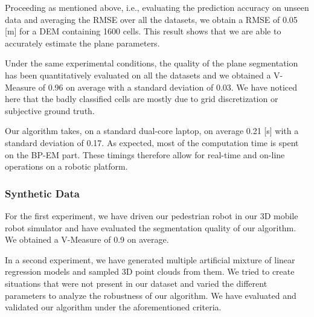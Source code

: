 Proceeding as mentioned above, i.e., evaluating the prediction accuracy on
unseen data and averaging the RMSE over all the datasets, we obtain a RMSE of
0.05 [m] for a DEM containing 1600 cells. This result shows that we are able
to accurately estimate the plane parameters.

Under the same experimental conditions, the quality of the plane segmentation
has been quantitatively evaluated on all the datasets and we obtained a
V-Measure of 0.96 on average with a standard deviation of 0.03. We have noticed
here that the badly classified cells are mostly due to grid discretization
or subjective ground truth.

Our algorithm takes, on a standard dual-core laptop, on average 0.21 [s] with
a standard deviation of 0.17. As expected, most of the computation time is spent
on the BP-EM part. These timings therefore allow for real-time and on-line
operations on a robotic platform.

\subsubsection{Synthetic Data}

For the first experiment, we have driven our pedestrian robot in our 3D mobile
robot simulator and have evaluated the segmentation quality of our algorithm. We
obtained a V-Measure of 0.9 on average.

In a second experiment, we have generated multiple artificial mixture of linear
regression models and sampled 3D point clouds from them. We tried to create
situations that were not present in our dataset and varied the different
parameters to analyze the robustness of our algorithm. We have evaluated and
validated our algorithm under the aforementioned criteria.
